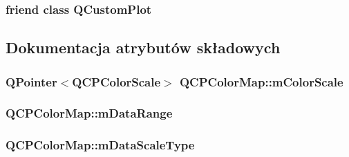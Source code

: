 \subsubsection[{\texorpdfstring{Q\+Custom\+Plot}{QCustomPlot}}]{\setlength{\rightskip}{0pt plus 5cm}friend class {\bf Q\+Custom\+Plot}\hspace{0.3cm}{\ttfamily [friend]}}\hypertarget{class_q_c_p_color_map_a1cdf9df76adcfae45261690aa0ca2198}{}\label{class_q_c_p_color_map_a1cdf9df76adcfae45261690aa0ca2198}


\subsection{Dokumentacja atrybutów składowych}
\subsubsection[{\texorpdfstring{m\+Color\+Scale}{mColorScale}}]{\setlength{\rightskip}{0pt plus 5cm}Q\+Pointer$<${\bf Q\+C\+P\+Color\+Scale}$>$ Q\+C\+P\+Color\+Map\+::m\+Color\+Scale\hspace{0.3cm}{\ttfamily [protected]}}\hypertarget{class_q_c_p_color_map_a95b4100bacc3387652c988b071ec9db7}{}\label{class_q_c_p_color_map_a95b4100bacc3387652c988b071ec9db7}
\subsubsection[{\texorpdfstring{m\+Data\+Range}{mDataRange}}]{ Q\+C\+P\+Color\+Map\+::m\+Data\+Range\hspace{0.3cm}{\ttfamily [protected]}}\hypertarget{class_q_c_p_color_map_ab87609621d16cd3e9d52ad070b327b08}{}\label{class_q_c_p_color_map_ab87609621d16cd3e9d52ad070b327b08}
\subsubsection[{\texorpdfstring{m\+Data\+Scale\+Type}{mDataScaleType}}]{ Q\+C\+P\+Color\+Map\+::m\+Data\+Scale\+Type\hspace{0.3cm}{\ttfamily [protected]}}\hypertarget{class_q_c_p_color_map_ab28a4b2def408f83b9818799d5f18446}{}\label{class_q_c_p_color_map_ab28a4b2def408f83b9818799d5f18446}

